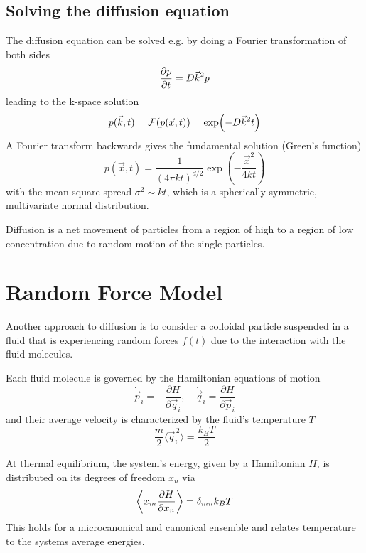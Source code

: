 \documentclass{notebook}
\begin{document}
\subsection*{Solving the diffusion equation}

The diffusion equation can be solved e.g. by doing a Fourier transformation of both sides
%
\begin{equation}
\pdv{p}{t} =  D \vec{k}^2 p
\end{equation}
%
leading to the k-space solution
%
\begin{equation}
p(\vec{k},t) = \mathcal{F}(p(\vec{x},t)) = \exp(-D \vec{k}^2 t)
\end{equation}
%
A Fourier transform backwards gives the fundamental solution (Green's function)
%
\begin{equation}
p(\vec{x},t) = \frac{1}{(4 \pi k t)^{d/2}} \exp(-\frac{\vec{x}^2}{4 k t})
\end{equation}
%
with the mean square spread $\sigma^2 \sim k t$, which is a spherically symmetric, multivariate normal distribution.

%
\begin{theorem}
	Diffusion is a net movement of particles from a region of high to a region of low concentration due to random motion of the single particles. 
\end{theorem}
%

\section{Random Force Model}

Another approach to diffusion is to consider a colloidal particle suspended in a fluid that is experiencing random forces $f(t)$ due to the interaction with the fluid molecules. 

Each fluid molecule is governed by the Hamiltonian equations of motion
%
\begin{equation}
	\dot{\vec{p}}_i = -\frac{\partial H}{\partial \vec{q}_i}, \quad 
	\dot{\vec{q}}_i = \frac{\partial H}{\partial \vec{p}_i}
\end{equation}
%
and their average velocity is characterized by the fluid's temperature $T$
%
\begin{equation}
	\frac{m}{2} \langle \vec{q}_i^{\,2} \rangle = \frac{k_B T}{2}
\end{equation}
%

\begin{theorem}
	At thermal equilibrium, the system's energy, given by a Hamiltonian $H$, is distributed on its degrees of freedom $x_n$ via
	\begin{equation}
		\expval{x_m \pdv{H}{x_n}} = \delta_{mn} k_B T
	\end{equation}
	This holds for a microcanonical and canonical ensemble and relates temperature to the systems average energies.
\end{theorem}
\end{document}
